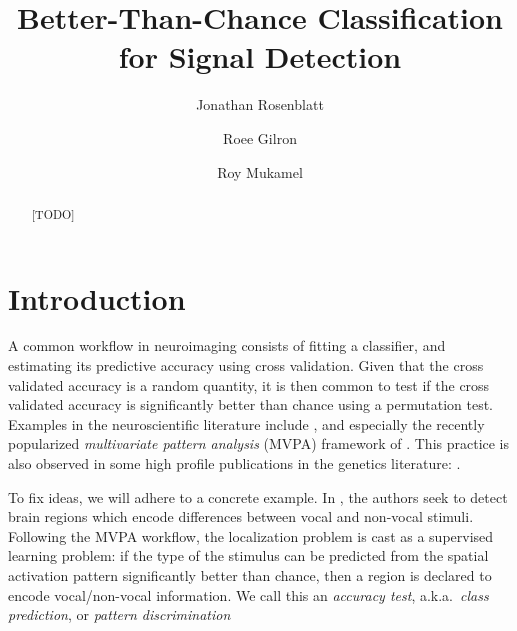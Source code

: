 \documentclass[12pt,a4paper]{article}
\author{Jonathan Rosenblatt \and Roee Gilron \and Roy Mukamel}
\title{Better-Than-Chance Classification for Signal Detection}
\theoremstyle{definition}
\begin{document}


\maketitle
\linenumbers

\begin{abstract}
[TODO]
\end{abstract}


\section{Introduction}
\label{sec:introduction}

A common workflow in neuroimaging consists of fitting a classifier, and estimating its predictive accuracy using cross validation. 
Given that the cross validated accuracy is a random quantity, it is then common to test if the cross validated accuracy is significantly better than chance using a permutation test.  
Examples in the neuroscientific literature include \citet{golland_permutation_2003,pereira_machine_2009,varoquaux_assessing_2016}, and especially the recently popularized \emph{multivariate pattern analysis} (MVPA) framework of \citet{kriegeskorte_information-based_2006}.
This practice is also observed in some high profile publications in the genetics literature: 
\citet{golub_molecular_1999,slonim_class_2000,radmacher_paradigm_2002,mukherjee_estimating_2003,juan_prediction_2004,jiang_calculating_2008}.


To fix ideas, we will adhere to a concrete example.
In \cite{gilron_quantifying_2016}, the authors seek to detect brain regions which encode differences between vocal and non-vocal stimuli. 
Following the MVPA workflow, the localization problem is cast as a supervised learning problem: if the type of the stimulus can be predicted from the spatial activation pattern significantly better than chance, then a region is declared to encode vocal/non-vocal information. 
We call this an \emph{accuracy test}, a.k.a.\ \emph{class prediction}, or \emph{pattern discrimination} 
\end{document}
